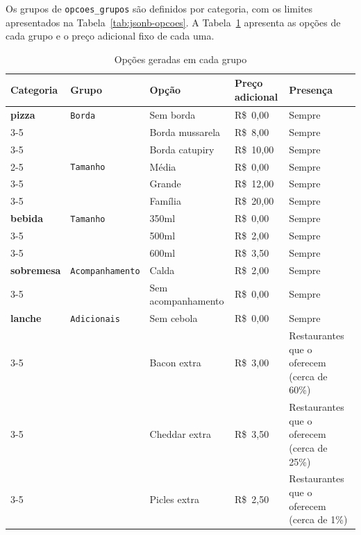Os grupos de \texttt{opcoes\_grupos} são definidos por categoria, com os limites apresentados na Tabela~\ref{tab:jsonb-opcoes}. A Tabela~\ref{tab:opcoes-geradas} apresenta as opções de cada grupo e o preço adicional fixo de cada uma.

\begin{table}[H]
    \centering
    \renewcommand{\arraystretch}{1.1}
    \caption{Opções geradas em cada grupo}
    \label{tab:opcoes-geradas}
    \small
    \begin{tabular}{|l|l|l|l|>{\raggedright\arraybackslash}p{3.6cm}|}
        \hline
        \textbf{Categoria} & \textbf{Grupo} & \textbf{Opção} & \textbf{Preço adicional} & \textbf{Presença} \\ \hline
        \textbf{pizza} & \texttt{Borda} & Sem borda & R\$~0,00 & Sempre \\ \cline{3-5}
         & & Borda mussarela & R\$~8,00 & Sempre \\ \cline{3-5}
         & & Borda catupiry & R\$~10,00 & Sempre \\ \cline{2-5}
         & \texttt{Tamanho} & Média & R\$~0,00 & Sempre \\ \cline{3-5}
         & & Grande & R\$~12,00 & Sempre \\ \cline{3-5}
         & & Família & R\$~20,00 & Sempre \\ \hline
        \textbf{bebida} & \texttt{Tamanho} & 350ml & R\$~0,00 & Sempre \\ \cline{3-5}
         & & 500ml & R\$~2,00 & Sempre \\ \cline{3-5}
         & & 600ml & R\$~3,50 & Sempre \\ \hline
        \textbf{sobremesa} & \texttt{Acompanhamento} & Calda & R\$~2,00 & Sempre \\ \cline{3-5}
         & & Sem acompanhamento & R\$~0,00 & Sempre \\ \hline
        \textbf{lanche} & \texttt{Adicionais} & Sem cebola & R\$~0,00 & Sempre \\ \cline{3-5}
         & & Bacon extra & R\$~3,00 & Restaurantes que o oferecem (cerca de 60\%) \\ \cline{3-5}
         & & Cheddar extra & R\$~3,50 & Restaurantes que o oferecem (cerca de 25\%) \\ \cline{3-5}
         & & Picles extra & R\$~2,50 & Restaurantes que o oferecem (cerca de 1\%) \\ \hline
    \end{tabular}
    \vspace{0.4em}
\end{table}

